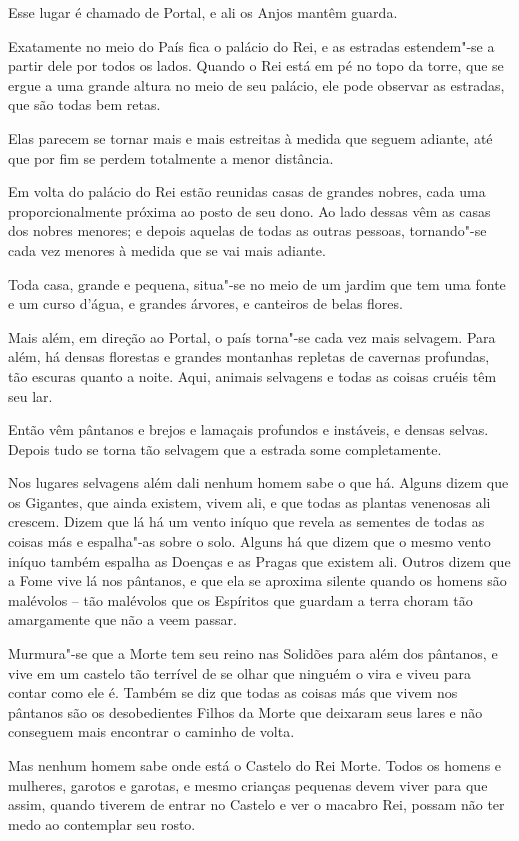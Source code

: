 Esse lugar é chamado de Portal, e ali os Anjos mantêm guarda.

Exatamente no meio do País fica o palácio do Rei, e as estradas
estendem"-se a partir dele por todos os lados. Quando o Rei está em pé no
topo da torre, que se ergue a uma grande altura no meio de seu palácio,
ele pode observar as estradas, que são todas bem retas.

Elas parecem se tornar mais e mais estreitas à medida que seguem
adiante, até que por fim se perdem totalmente a menor distância.

Em volta do palácio do Rei estão reunidas casas de grandes nobres, cada
uma proporcionalmente próxima ao posto de seu dono. Ao lado dessas vêm
as casas dos nobres menores; e depois aquelas de todas as outras
pessoas, tornando"-se cada vez menores à medida que se vai mais adiante.

Toda casa, grande e pequena, situa"-se no meio de um jardim que tem uma
fonte e um curso d'água, e grandes árvores, e canteiros de belas flores.

Mais além, em direção ao Portal, o país torna"-se cada vez mais selvagem.
Para além, há densas florestas e grandes montanhas repletas de cavernas
profundas, tão escuras quanto a noite. Aqui, animais selvagens e todas
as coisas cruéis têm seu lar.

Então vêm pântanos e brejos e lamaçais profundos e instáveis, e densas
selvas. Depois tudo se torna tão selvagem que a estrada some
completamente.

Nos lugares selvagens além dali nenhum homem sabe o que há. Alguns dizem
que os Gigantes, que ainda existem, vivem ali, e que todas as plantas
venenosas ali crescem. Dizem que lá há um vento iníquo que revela as
sementes de todas as coisas más e espalha"-as sobre o solo. Alguns há que
dizem que o mesmo vento iníquo também espalha as Doenças e as Pragas que
existem ali. Outros dizem que a Fome vive lá nos pântanos, e que ela se
aproxima silente quando os homens são malévolos -- tão malévolos que os
Espíritos que guardam a terra choram tão amargamente que não a veem
passar.

Murmura"-se que a Morte tem seu reino nas Solidões para além dos
pântanos, e vive em um castelo tão terrível de se olhar que ninguém o
vira e viveu para contar como ele é. Também se diz que todas as coisas
más que vivem nos pântanos são os desobedientes Filhos da Morte que
deixaram seus lares e não conseguem mais encontrar o caminho de volta.

Mas nenhum homem sabe onde está o Castelo do Rei Morte. Todos os homens
e mulheres, garotos e garotas, e mesmo crianças pequenas devem viver
para que assim, quando tiverem de entrar no Castelo e ver o macabro Rei,
possam não ter medo ao contemplar seu rosto.

